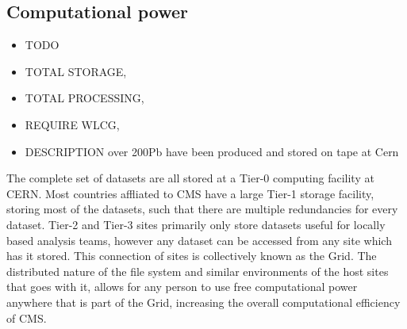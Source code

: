 \subsection{Computational power} %
\label{sub:computational_power}
\begin{itemize}
	\item TODO 
	\item TOTAL STORAGE, 
	\item TOTAL PROCESSING, 
	\item REQUIRE WLCG, 
	\item DESCRIPTION over 200\unit{Pb} have been produced and stored on tape at Cern 
\end{itemize}

The complete set of datasets are all stored at a Tier-0 computing facility at CERN. Most countries affliated to CMS have a large Tier-1 storage facility, storing most of the datasets, such that there are multiple redundancies for every dataset. Tier-2 and Tier-3 sites primarily only store datasets useful for locally based analysis teams, however any dataset can be accessed from any site which has it stored.
This connection of sites is collectively known as the Grid.
The distributed nature of the file system and similar environments of the host sites that goes with it, allows for any person to use free computational power anywhere that is part of the Grid, increasing the overall computational efficiency of CMS.




